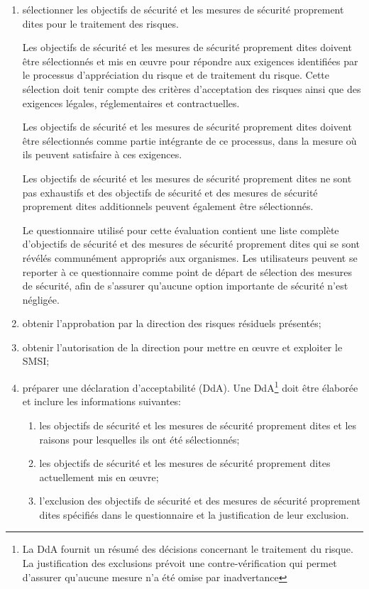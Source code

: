 \begin{enumerate}
	\item sélectionner les objectifs de sécurité et les mesures de sécurité proprement dites pour le traitement des risques.

	Les objectifs de sécurité et les mesures de sécurité proprement dites doivent être sélectionnés et mis en \oe{}uvre pour répondre aux exigences identifiées par le processus d'appréciation du risque et de traitement du risque. Cette sélection doit tenir compte des critères d'acceptation des risques ainsi que des exigences légales, réglementaires et contractuelles.

	Les objectifs de sécurité et les mesures de sécurité proprement dites doivent être sélectionnés comme partie intégrante de ce processus, dans la mesure où ils peuvent satisfaire à ces exigences.

	Les objectifs de sécurité et les mesures de sécurité proprement dites ne sont pas exhaustifs et des objectifs de sécurité et des mesures de sécurité proprement dites additionnels peuvent également être sélectionnés.

	Le questionnaire utilisé pour cette évaluation contient une liste complète d'objectifs de sécurité et des mesures de sécurité proprement dites qui se sont révélés communément appropriés aux organismes. Les utilisateurs peuvent se reporter à ce questionnaire comme point de départ de sélection des mesures de sécurité, afin de s'assurer qu'aucune option importante de sécurité n'est négligée.

	\item obtenir l'approbation par la direction des risques résiduels présentés;

	\item obtenir l'autorisation de la direction pour mettre en \oe{}uvre et exploiter le SMSI;

	\item préparer une déclaration d'acceptabilité (DdA). Une DdA\footnote{La DdA fournit un résumé des décisions concernant le traitement du risque. La justification des exclusions prévoit une contre-vérification qui permet d'assurer qu'aucune mesure n'a été omise par inadvertance} doit être élaborée et inclure les informations suivantes:
	\begin{enumerate}
		\item les objectifs de sécurité et les mesures de sécurité proprement dites et les raisons pour lesquelles ils ont été sélectionnés;
		\item les objectifs de sécurité et les mesures de sécurité proprement dites actuellement mis en \oe{}uvre;
		\item l'exclusion des objectifs de sécurité et des mesures de sécurité proprement dites spécifiés dans le questionnaire et la justification de leur exclusion.
	\end{enumerate}
\end{enumerate}

